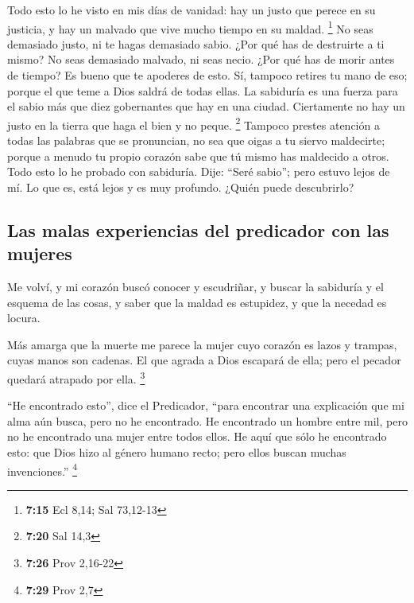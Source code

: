 \begin{paracol}{2}
 Todo esto lo he visto en mis días de vanidad: hay un
justo que perece en su justicia, y hay un malvado que vive mucho tiempo
en su maldad. \footnote{\textbf{7:15} Ecl 8,14; Sal 73,12-13}
 No seas demasiado justo, ni te hagas demasiado sabio.
¿Por qué has de destruirte a ti mismo?  No seas demasiado
malvado, ni seas necio. ¿Por qué has de morir antes de tiempo?
 Es bueno que te apoderes de esto. Sí, tampoco retires tu
mano de eso; porque el que teme a Dios saldrá de todas ellas.
 La sabiduría es una fuerza para el sabio más que diez
gobernantes que hay en una ciudad.  Ciertamente no hay un
justo en la tierra que haga el bien y no peque. \footnote{\textbf{7:20}
  Sal 14,3}  Tampoco prestes atención a todas las
palabras que se pronuncian, no sea que oigas a tu siervo maldecirte;
 porque a menudo tu propio corazón sabe que tú mismo has
maldecido a otros.  Todo esto lo he probado con
sabiduría. Dije: ``Seré sabio''; pero estuvo lejos de mí.
 Lo que es, está lejos y es muy profundo. ¿Quién puede
descubrirlo?

\hypertarget{las-malas-experiencias-del-predicador-con-las-mujeres}{%
\subsection{Las malas experiencias del predicador con las
mujeres}\label{las-malas-experiencias-del-predicador-con-las-mujeres}}

 Me volví, y mi corazón buscó conocer y escudriñar, y
buscar la sabiduría y el esquema de las cosas, y saber que la maldad es
estupidez, y que la necedad es locura.

 Más amarga que la muerte me parece la mujer cuyo corazón
es lazos y trampas, cuyas manos son cadenas. El que agrada a Dios
escapará de ella; pero el pecador quedará atrapado por ella. \footnote{\textbf{7:26}
  Prov 2,16-22}

 ``He encontrado esto'', dice el Predicador, ``para
encontrar una explicación  que mi alma aún busca, pero no
he encontrado. He encontrado un hombre entre mil, pero no he encontrado
una mujer entre todos ellos.  He aquí que sólo he
encontrado esto: que Dios hizo al género humano recto; pero ellos buscan
muchas invenciones.'' \footnote{\textbf{7:29} Prov 2,7}

\switchcolumn
\begin{otherlanguage}{english}


\end{otherlanguage}
\end{paracol}
